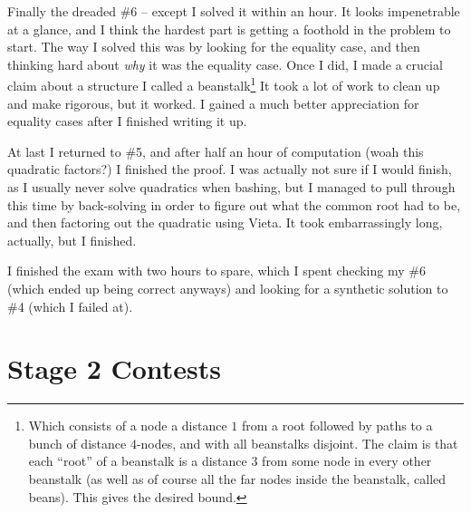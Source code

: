 \documentclass[11pt]{scrreprt}
\begin{document}
Finally the dreaded \#6 -- except I solved it within an hour.
It looks impenetrable at a glance,
and I think the hardest part is getting a foothold in the problem to start.
The way I solved this was by looking for the equality case,
and then thinking hard about \emph{why} it was the equality case.
Once I did, I made a crucial claim about a structure I called a
beanstalk\footnote{Which consists of a node a distance $1$ from a root followed
by paths to a bunch of distance $4$-nodes, and with all beanstalks disjoint.
The claim is that each ``root'' of a beanstalk is a distance $3$ from some node
in every other beanstalk (as well as of course all the far nodes inside the beanstalk, called beans).
This gives the desired bound.} It took a lot of work to clean up and make rigorous, but it worked.
I gained a much better appreciation for equality cases after I finished writing it up.

At last I returned to \#5, and after half an hour of computation (woah this
quadratic factors?) I finished the proof.
I was actually not sure if I would finish, as I usually never solve quadratics when bashing,
but I managed to pull through this time by back-solving in order to figure out
what the common root had to be, and then factoring out the quadratic using Vieta.
It took embarrassingly long, actually, but I finished.

I finished the exam with two hours to spare,
which I spent checking my \#6 (which ended up being correct anyways) and looking
for a synthetic solution to \#4 (which I failed at).

\section{Stage 2 Contests}
\end{document}
